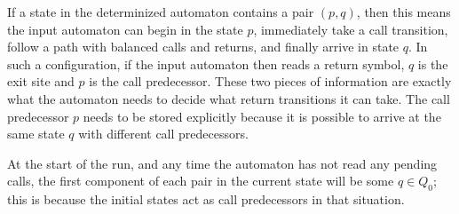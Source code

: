 If a state in the determinized automaton contains a pair $(p,q)$, then this
means the input automaton can begin in the state $p$, immediately take a call
transition, follow a path with balanced calls and returns, and finally arrive
in state $q$. In such a configuration, if the input automaton then reads a
return symbol, $q$ is the exit site and $p$ is the call predecessor. These
two pieces of information are exactly what the automaton needs to decide what
return transitions it can take. The call predecessor $p$ needs to be stored
explicitly because it is possible to arrive at the same state $q$ with
different call predecessors.

At the start of the run, and any time the automaton has not read any pending
calls, the first component of each pair in the current state will be some $q
\in Q_0$; this is because the initial states act as call predecessors in that
situation.

\newcommand{\WL}{\textit{WL}}


